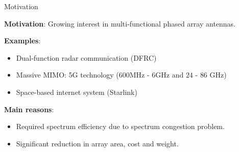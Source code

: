 \documentclass[../main.tex]{subfiles}
\begin{document}
%
%


\begin{frame}[t]{Motivation}

\textbf{Motivation}: Growing interest in multi-functional phased array antennas.

\textbf{Examples}:

\begin{itemize}
    \item Dual-function radar communication (DFRC)
    \item Massive MIMO: 5G technology ($600$MHz - $6$GHz and $24$ - $86$ GHz)
    \item Space-based internet system (Starlink)
\end{itemize}

\textbf{Main reasons}: 
\begin{itemize}
    \item Required spectrum efficiency due to spectrum congestion problem.
    \item Significant reduction in array area, cost and weight.
\end{itemize}


\end{frame}



%
%
\end{document}
